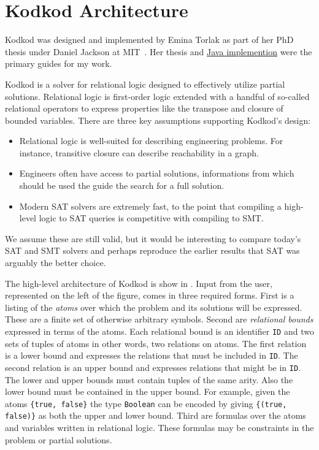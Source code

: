 \section{Kodkod Architecture}
\label{sec:kodkod}

Kodkod was designed and implemented by Emina Torlak as part of her PhD thesis
 under Daniel Jackson at MIT~\cite{t-dissertation-2009}.
Her thesis and \href{http://alloy.mit.edu/kodkod/release/current/doc/}{Java implemention} were the primary guides for my work.

Kodkod is a solver for relational logic designed to effectively utilize partial solutions.
Relational logic is first-order logic extended with a handful of so-called relational operators
 to express properties like the transpose and closure of bounded variables.
There are three key assumptions supporting Kodkod's design:
\begin{itemize}
\item Relational logic is well-suited for describing engineering problems.
   For instance, transitive closure can describe reachability in a graph.
\item Engineers often have access to partial solutions, informations from
   which should be used the guide the search for a full solution.
\item Modern SAT solvers are extremely fast, to the point that compiling
   a high-level logic to SAT queries is competitive with compiling to SMT.
\end{itemize}

We assume these are still valid, but it would be interesting to compare
 today's SAT and SMT solvers and perhaps reproduce the earlier results that
 SAT was arguably the better choice.

The high-level architecture of Kodkod is show in .
Input from the user, represented on the left of the figure, comes in three
 required forms.
First is a listing of the \emph{atoms} over which the problem and its solutions
 will be expressed.
These are a finite set of otherwise arbitrary symbols.
Second are \emph{relational bounds} expressed in terms of the atoms.
Each relational bound is an identifier {\tt ID} and two sets of tuples of atoms\textemdash
 in other words, two relations on atoms.
The first relation is a lower bound and expresses the relations that must
 be included in {\tt ID}.
The second relation is an upper bound and expresses relations that might be
 in {\tt ID}.
The lower and upper bounds must contain tuples of the same arity.
Also the lower bound must be contained in the upper bound.
For example, given the atoms {\tt\{true, false\}}
 the type {\tt Boolean} can be encoded by giving {\tt\{(true, false)\}} as
 both the upper and lower bound.
Third are formulas over the atoms and variables written in relational logic.
These formulas may be constraints in the problem or partial solutions.

